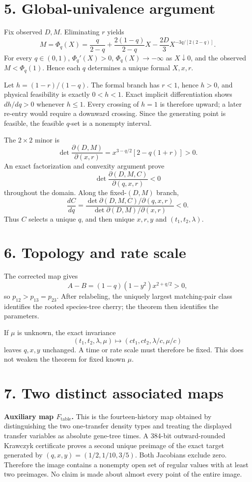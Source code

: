 \documentclass[10pt,twocolumn]{extarticle}
\newcommand{\Table}{F_{\mathrm{table}}}
\begin{document}
\newpage
\section*{5. Global-univalence argument}
Fix observed $D,M$.  Eliminating $r$ yields
\[
M=\Phi_q(X)=\frac{q}{2-q}+\frac{2(1-q)}{2-q}X
-\frac{2D}{3}X^{-3q/[2(2-q)]}.
\]
For every $q\in(0,1)$, $\Phi_q'(X)>0$, $\Phi_q(X)\to-\infty$ as $X\downarrow0$, and the observed $M<\Phi_q(1)$.  Hence each $q$ determines a unique formal $X,x,r$.

Let $h=(1-r)/(1-q)$.  The formal branch has $r<1$, hence $h>0$, and physical feasibility is exactly $0<h<1$.  Exact implicit differentiation shows $dh/dq>0$ whenever $h\le1$.  Every crossing of $h=1$ is therefore upward; a later re-entry would require a downward crossing.  Since the generating point is feasible, the feasible $q$-set is a nonempty interval.

The $2\times2$ minor is
\[
\det\frac{\partial(D,M)}{\partial(x,r)}
=x^{3-q/2}[2-q(1+r)]>0.
\]
An exact factorization and convexity argument prove
\[
\det\frac{\partial(D,M,C)}{\partial(q,x,r)}<0
\]
throughout the domain.  Along the fixed-$(D,M)$ branch,
\[
\frac{dC}{dq}=
\frac{\det\partial(D,M,C)/\partial(q,x,r)}
{\det\partial(D,M)/\partial(x,r)}<0.
\]
Thus $C$ selects a unique $q$, and then unique $x,r,y$ and $(t_1,t_2,\lambda)$.

\balance
\section*{6. Topology and rate scale}
The corrected map gives
\[
A-B=(1-q)(1-y^2)x^{2+q/2}>0,
\]
so $p_{12}>p_{13}=p_{23}$.  After relabeling, the uniquely largest matching-pair class identifies the rooted species-tree cherry; the theorem then identifies the parameters.

If $\mu$ is unknown, the exact invariance
\[
(t_1,t_2,\lambda,\mu)\mapsto
(ct_1,ct_2,\lambda/c,\mu/c)
\]
leaves $q,x,y$ unchanged.  A time or rate scale must therefore be fixed.  This does not weaken the theorem for fixed known $\mu$.

\section*{7. Two distinct associated maps}
\textbf{Auxiliary map $\Table$.}  This is the fourteen-history map obtained by distinguishing the two one-transfer density types and treating the displayed transfer variables as absolute gene-tree times.  A 384-bit outward-rounded Krawczyk certificate proves a second unique preimage of the exact target generated by $(q,x,y)=(1/2,1/10,3/5)$.  Both Jacobians exclude zero.  Therefore the image contains a nonempty open set of regular values with at least two preimages.  No claim is made about almost every point of the entire image.
\end{document}
